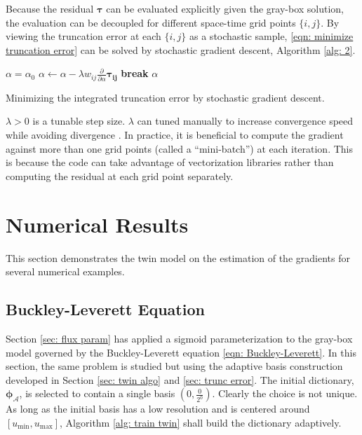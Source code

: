 Because the residual $\boldsymbol{\tau}$ can be evaluated explicitly given the gray-box
solution, 
the evaluation can be decoupled for different space-time grid points $\{i,j\}$. By viewing
the truncation error at each $\{i,j\}$ as a stochastic sample, \eqref{eqn: minimize truncation error}
can be solved by stochastic gradient descent, Algorithm \ref{alg: 2}.\\
\begin{algorithm}[htbp]
\begin{algorithmic}[1]
    \REQUIRE $\alpha = \alpha_0$
             \STATE $\alpha \leftarrow \alpha -\lambda w_{ij}\left.\frac{\partial }{\partial \alpha} 
             \boldsymbol{\tau_{ij}} \right.$
         \ELSE
             \STATE \textbf{break}
         \ENDIF
    \ENDFOR
    \ENSURE $\alpha$
\end{algorithmic}
\caption{Minimizing the integrated truncation error by stochastic gradient descent.}
\label{alg: 2}
\end{algorithm}

$\lambda>0$ is a tunable step size. $\lambda$ can tuned manually to 
increase convergence speed while avoiding divergence \cite{stochastic search}.
In practice, it is beneficial to compute the gradient
against more than one grid points (called a ``mini-batch'') at each iteration. This is because
the code can take advantage of vectorization libraries rather than computing the residual 
at each grid point separately.\\


\section{Numerical Results}
\label{sec: twin numerical results}
This section demonstrates the twin model on the estimation of the gradients for
several numerical examples.


\subsection{Buckley-Leverett Equation}
\label{sec: chap 2 BL}
Section \ref{sec: flux param} has applied a sigmoid parameterization to the gray-box model
governed by the Buckley-Leverett equation \eqref{eqn: Buckley-Leverett}.
In this section, the same problem is studied but using the adaptive basis construction developed 
in Section \ref{sec: twin algo} and \ref{sec: trunc error}. 
The initial dictionary, $\boldsymbol{\phi}_{\mathcal{A}}$, is selected to contain a single basis
$\left(0, \frac{0}{2^0}\right)$. Clearly the choice is not unique. 
As long as the
initial basis has a low resolution and is centered around $\left[u_{\min}, u_{\max}\right]$,
Algorithm \ref{alg: train twin} shall build the dictionary adaptively.\\

